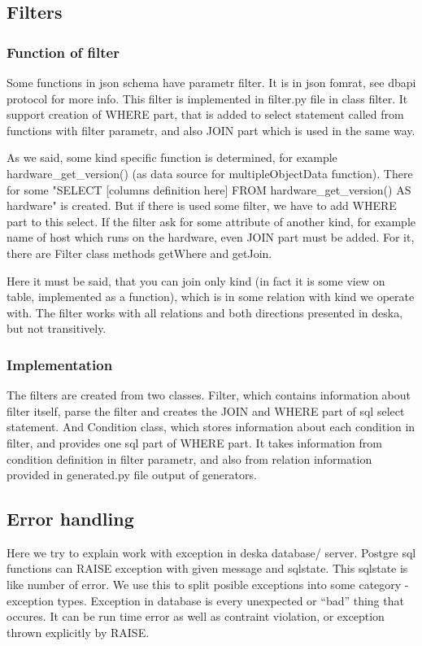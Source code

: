 \documentclass[deska]{subfiles}
\begin{document}
\subsection{Filters}

\subsubsection{Function of filter}

Some functions in json schema have parametr filter. It is in json fomrat, see dbapi protocol for more info.
This filter is implemented in filter.py file in class filter. It support creation of WHERE part, that is added to select statement called from functions with filter parametr, and also JOIN part which is used in the same way.

As we said, some kind specific function is determined, for example hardware\_get\_version() (as data source for multipleObjectData function). There for some "SELECT [columns definition here] FROM hardware\_get\_version() AS hardware" is created. But if there is used some filter, we have to add WHERE part to this select. If the filter ask for some attribute of another kind, for example name of host which runs on the hardware, even JOIN part must be added. For it, there are Filter class methods getWhere and getJoin. 

Here it must be said, that you can join only kind (in fact it is some view on table, implemented as a function), which is in some relation with kind we operate with. The filter works with all relations and both directions presented in deska, but not transitively.

\subsubsection{Implementation}

The filters are created from two classes. Filter, which contains information about filter itself, parse the filter and creates
the JOIN and WHERE part of sql select statement. And Condition class, which stores information about each condition in filter, and provides
one sql part of WHERE part. It takes information from condition definition in filter parametr, and also from relation information provided
in generated.py file output of generators.

\subsection{Error handling}
Here we try to explain work with exception in deska database/ server. Postgre sql functions can RAISE exception with given message and sqlstate.
This sqlstate is like number of error. We use this to split posible exceptions into some category - exception types. Exception in database is
every unexpected or “bad” thing that occures. It can be run time error as well as contraint violation, or exception thrown explicitly by RAISE.
\end{document}

